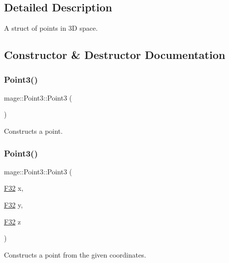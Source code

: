 \subsection{Detailed Description}
A struct of points in 3D space. 

\subsection{Constructor \& Destructor Documentation}
\hypertarget{structmage_1_1_point3_aab371cb187cadc61b81e5d09c8eed1e5}{}\label{structmage_1_1_point3_aab371cb187cadc61b81e5d09c8eed1e5} 
\subsubsection{\texorpdfstring{Point3()}{Point3()}\hspace{0.1cm}{\footnotesize\ttfamily [1/6]}}
{\footnotesize\ttfamily mage\+::\+Point3\+::\+Point3 (\begin{DoxyParamCaption}{ }\end{DoxyParamCaption})\hspace{0.3cm}{\ttfamily [noexcept]}}

Constructs a point. \hypertarget{structmage_1_1_point3_af7e50841e6bec16661a2de6c74dc9498}{}\label{structmage_1_1_point3_af7e50841e6bec16661a2de6c74dc9498} 
\subsubsection{\texorpdfstring{Point3()}{Point3()}\hspace{0.1cm}{\footnotesize\ttfamily [2/6]}}
{\footnotesize\ttfamily mage\+::\+Point3\+::\+Point3 (\begin{DoxyParamCaption}\item[{\hyperlink{namespacemage_aa97e833b45f06d60a0a9c4fc22ae02c0}{F32}}]{x,  }\item[{\hyperlink{namespacemage_aa97e833b45f06d60a0a9c4fc22ae02c0}{F32}}]{y,  }\item[{\hyperlink{namespacemage_aa97e833b45f06d60a0a9c4fc22ae02c0}{F32}}]{z }\end{DoxyParamCaption})\hspace{0.3cm}{\ttfamily [noexcept]}}

Constructs a point from the given coordinates.


